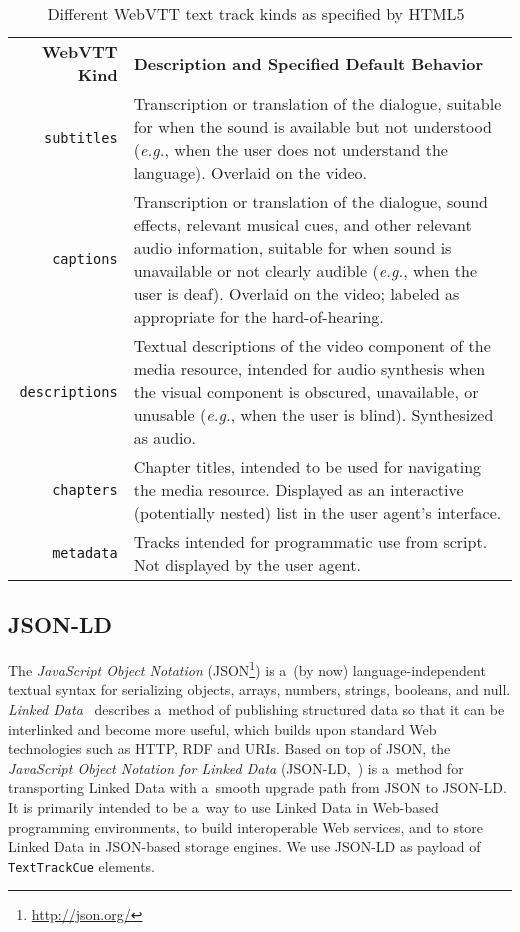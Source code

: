 \documentclass{sig-alternate}
\newcommand{\inlinelistingsize}{\fontsize{8pt}{11pt}}
\let\oldurl\url
\renewcommand{\url}[1]{\inlinelistingsize\oldurl{#1}}
\begin{document}
\begin{table*}[h!]\footnotesize
\begin{tabular}{ r p{15cm} }
\textbf{WebVTT Kind} & \textbf{Description and Specified Default Behavior}\\

\texttt{subtitles} & Transcription or translation of the dialogue,
suitable for when the sound is available but not understood
(\emph{e.g.}, when the user does not understand the language). Overlaid on the video.\\

\texttt{captions} & Transcription or translation of the dialogue,
sound effects, relevant musical cues,
and other relevant audio information,
suitable for when sound is unavailable or not clearly audible
(\emph{e.g.}, when the user is deaf). Overlaid on the video;
labeled as appropriate for the hard-of-hearing.\\

\texttt{descriptions} & Textual descriptions of the video component
of the media resource, intended for audio synthesis
when the visual component is obscured, unavailable, or unusable
(\emph{e.g.}, when the user is blind).
Synthesized as audio.\\

\texttt{chapters} & Chapter titles, intended to be used for navigating
the media resource. Displayed as an interactive (potentially nested)
list in the user agent's interface.\\

\texttt{metadata} & Tracks intended for programmatic use from script.
Not displayed by the user agent.\\
\end{tabular}
  \caption{Different WebVTT text track kinds as specified by
    HTML5~\cite{berjon2013html5}}
  \label{table:texttrackkinds}
\end{table*}

\subsection{JSON-LD}

The \emph{JavaScript Object Notation}
(JSON\footnote{\url{http://json.org/}})
is a~(by now) language-independent textual syntax
for serializing objects, arrays, numbers, strings, booleans, and null.
\emph{Linked Data}~\cite{bizer2009linkeddata}
describes a~method of publishing structured data
so that it can be interlinked and become more useful,
which builds upon standard Web technologies such as HTTP, RDF and URIs.
Based on top of JSON, the
\emph{JavaScript Object Notation for Linked Data}
(JSON-LD,~\cite{sporny2013jsonld}) is a~method for transporting
Linked Data with a~smooth upgrade path from JSON to JSON-LD.
It is primarily intended to be a~way to use
Linked Data in Web-based programming environments,
to build interoperable Web services,
and to store Linked Data in JSON-based storage engines.
We use JSON-LD as payload of \texttt{TextTrackCue} elements.
\end{document}
